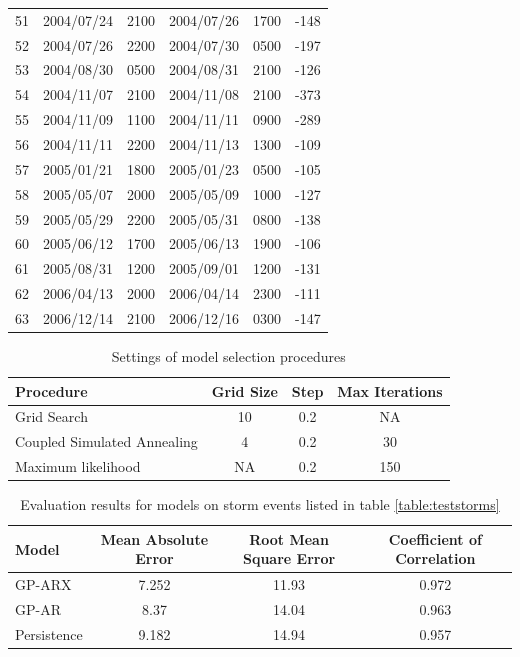 \documentclass{article}
\begin{document}
\begin{table}[h]
\begin{tabular}{cccccc}
    51 & 2004/07/24 & 2100 & 2004/07/26 & 1700 & -148 \\
    52 & 2004/07/26 & 2200 & 2004/07/30 & 0500 & -197 \\
    53 & 2004/08/30 & 0500 & 2004/08/31 & 2100 & -126 \\
    54 & 2004/11/07 & 2100 & 2004/11/08 & 2100 & -373 \\
    55 & 2004/11/09 & 1100 & 2004/11/11 & 0900 & -289 \\
    56 & 2004/11/11 & 2200 & 2004/11/13 & 1300 & -109 \\
    57 & 2005/01/21 & 1800 & 2005/01/23 & 0500 & -105 \\
    58 & 2005/05/07 & 2000 & 2005/05/09 & 1000 & -127 \\
    59 & 2005/05/29 & 2200 & 2005/05/31 & 0800 & -138 \\
    60 & 2005/06/12 & 1700 & 2005/06/13 & 1900 & -106 \\
    61 & 2005/08/31 & 1200 & 2005/09/01 & 1200 & -131 \\
    62 & 2006/04/13 & 2000 & 2006/04/14 & 2300 & -111 \\
    63 & 2006/12/14 & 2100 & 2006/12/16 & 0300 & -147 \\ \hline
  \end{tabular}%
\end{table}

\begin{table}[h]
  \centering
  \caption{Settings of model selection procedures}
  \begin{tabular}{l c c c}
    \hline
    Procedure & Grid Size & Step & Max Iterations \\
    \hline
    Grid Search & 10 & 0.2 & NA \\
    Coupled Simulated Annealing & 4 & 0.2 & 30 \\
    Maximum likelihood & NA & 0.2 & 150\\
  \end{tabular}
  \label{table:modelselection}
\end{table}

\begin{table}[h]
  \centering
  \caption{Evaluation results for models on storm events listed in table \ref{table:teststorms}}
  \label{table:results}
  \begin{tabular}{l c c c}
    \hline
    Model & Mean Absolute Error & Root Mean Square Error & Coefficient of Correlation\\ \hline
    GP-ARX & 7.252 & 11.93 & 0.972\\
    GP-AR & 8.37 & 14.04 & 0.963\\
    Persistence & 9.182 & 14.94 & 0.957\\
  \end{tabular}
\end{table}


\clearpage 


\end{document}
